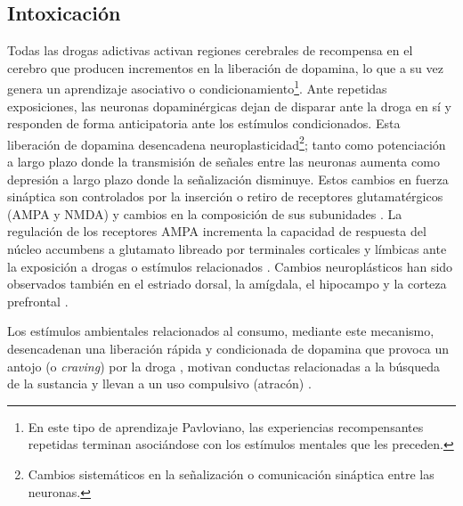 \subsection{Intoxicación}
\label{intox}
Todas las drogas adictivas activan regiones cerebrales de recompensa en el cerebro que producen incrementos en la liberación de dopamina, lo que a su vez genera un aprendizaje asociativo o condicionamiento\footnote{En este tipo de aprendizaje Pavloviano, las experiencias recompensantes repetidas terminan asociándose con los estímulos mentales que les preceden.}.
Ante repetidas exposiciones, las neuronas dopaminérgicas dejan de disparar ante la droga en sí y responden de forma anticipatoria ante los estímulos condicionados. Esta liberación de dopamina desencadena neuroplasticidad\footnote{Cambios sistemáticos en la señalización o comunicación sináptica entre las neuronas.}; tanto como potenciación a largo plazo \textemdash donde la transmisión de señales entre las neuronas aumenta\textemdash{} como depresión a largo plazo \textemdash donde la señalización disminuye. Estos cambios en fuerza sináptica son controlados por la inserción o retiro de receptores glutamatérgicos (AMPA y NMDA) y cambios en la composición de sus subunidades \parencite{Volkow2016}. La regulación de los receptores AMPA incrementa la capacidad de respuesta del núcleo accumbens a glutamato libreado por terminales corticales y límbicas ante la exposición a drogas o estímulos relacionados \parencite{Wolf2010}. Cambios neuroplásticos han sido observados también en el estriado dorsal, la amígdala, el hipocampo y la corteza prefrontal \parencite{Volkow2016}.\par
Los estímulos ambientales relacionados al consumo, mediante este mecanismo, desencadenan una liberación rápida y condicionada de dopamina que provoca un antojo (o \textit{craving}) por la droga \parencite{Volkow2006}, motivan conductas relacionadas a la búsqueda de la sustancia y llevan a un uso compulsivo (atracón) \parencite{Volkow2016}.

